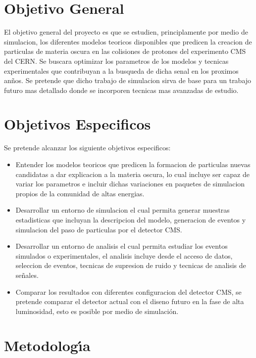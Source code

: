 \chapter{Objetivo General}

El objetivo general del proyecto es que se estudien, principlamente por medio de simulacion, los diferentes modelos teoricos disponibles que predicen la creacion de particulas de materia oscura en las colisiones de protones del experimento CMS del CERN.  Se buscara optimizar los parametros de los modelos y tecnicas experimentales que contribuyan a la busqueda de dicha senal en los proximos an\~nos.   Se pretende que dicho trabajo de simulacion sirva de base para un trabajo futuro mas detallado donde se incorporen tecnicas mas avanzadas de estudio. 


\chapter{Objetivos Especificos}

Se pretende alcanzar los siguiente objetivos especificos: 

\begin{itemize}
\item Entender los modelos teoricos que predicen la formacion de particulas nuevas candidatas a dar explicacion a la materia oscura, lo cual incluye ser capaz de variar los parametros e incluir dichas variaciones en paquetes de simulacion propios de la comunidad de altas energias. 
\item Desarrollar un entorno de simulacion el cual permita generar muestras estadisticas que incluyan la descripcion del modelo, generacion de eventos y simulacion del paso de particulas por el detector CMS. 
 \item Desarrollar un entorno de analisis el cual permita estudiar los eventos simulados o experimentales, el analisis incluye desde el acceso de datos, seleccion de eventos, tecnicas de supresion de ruido y tecnicas de analisis de se\~nales. 
\item Comparar los resultados con diferentes configuracion del detector CMS, se pretende comparar el detector actual con el diseno futuro en la fase de alta luminosidad, esto es posible por medio de simulaci\'on. 
  
\end{itemize}


\chapter{Metodolog\'{\i}a}

